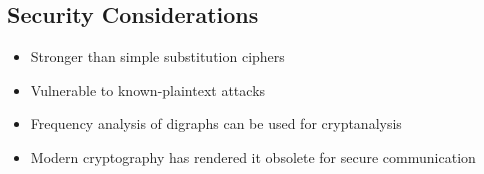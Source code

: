 \documentclass[12pt,a4paper]{article}
\begin{document}


\subsection*{Security Considerations}
\begin{itemize}
    \item Stronger than simple substitution ciphers
    \item Vulnerable to known-plaintext attacks
    \item Frequency analysis of digraphs can be used for cryptanalysis
    \item Modern cryptography has rendered it obsolete for secure communication
\end{itemize}



\end{document}
